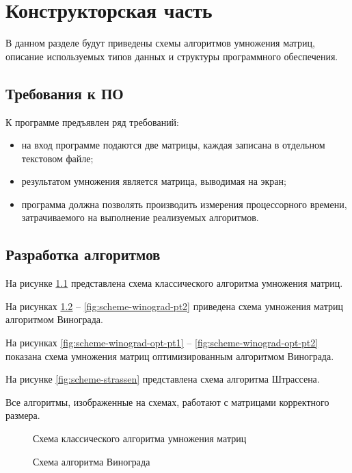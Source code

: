 \chapter{Конструкторская часть}

В данном разделе будут приведены схемы алгоритмов умножения матриц, описание используемых типов данных и структуры программного обеспечения.

\section{Требования к ПО}

К программе предъявлен ряд требований:

\begin{itemize}
    \item на вход программе подаются две матрицы, каждая записана в отдельном текстовом файле;
    \item результатом умножения является матрица, выводимая на экран;
    \item программа должна позволять производить измерения процессорного времени, затрачиваемого на выполнение реализуемых алгоритмов.
\end{itemize}

\section{Разработка алгоритмов}

На рисунке \ref{fig:scheme-classic} представлена схема классического алгоритма умножения матриц.

На рисунках \ref{fig:scheme-winograd-pt1} -- \ref{fig:scheme-winograd-pt2} приведена схема умножения матриц алгоритмом Винограда.

На рисунках \ref{fig:scheme-winograd-opt-pt1} -- \ref{fig:scheme-winograd-opt-pt2} показана схема умножения матриц оптимизированным алгоритмом Винограда.

На рисунке \ref{fig:scheme-strassen} представлена схема алгоритма Штрассена.

Все алгоритмы, изображенные на схемах, работают с матрицами корректного размера.

\begin{figure}[H]
    \centering
    
    \caption{Схема классического алгоритма умножения матриц}
    \label{fig:scheme-classic}
\end{figure}

\begin{figure}[H]
    \centering
    
    \caption{Схема алгоритма Винограда}
    \label{fig:scheme-winograd-pt1}
\end{figure}


